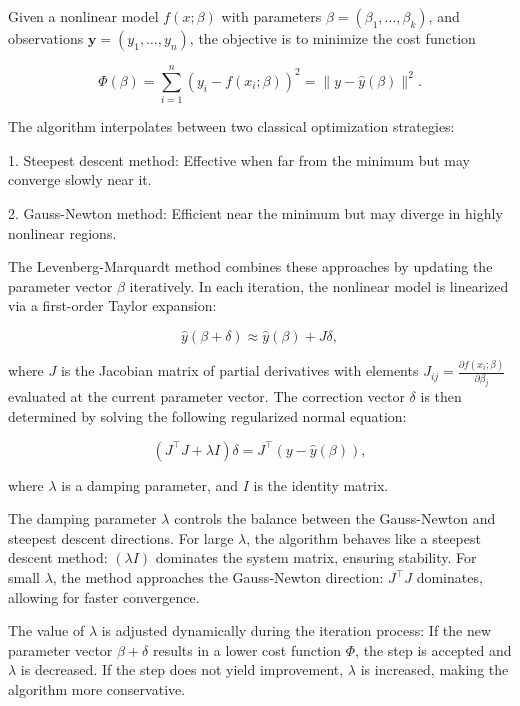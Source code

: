 Given a nonlinear model $f(x; \beta)$ with parameters $\beta = (\beta_1, \dots, \beta_k)$, and observations $\mathbf{y} = (y_1, \dots, y_n)$, the objective is to minimize the cost function

\begin{equation}
	\Phi(\beta) = \sum_{i=1}^{n} \left( y_i - f(x_i; \beta) \right)^2 = \| y - \hat{y}(\beta) \|^2.
\end{equation}

The algorithm interpolates between two classical optimization strategies:

1. Steepest descent method: Effective when far from the minimum but may converge slowly near it.

2. Gauss-Newton method: Efficient near the minimum but may diverge in highly nonlinear regions.

The Levenberg-Marquardt method combines these approaches by updating the parameter vector $\beta$ iteratively. In each iteration, the nonlinear model is linearized via a first-order Taylor expansion:

\begin{equation}
	\hat{y}(\beta + \delta) \approx \hat{y}(\beta) + J \delta,
\end{equation}

where $J$ is the Jacobian matrix of partial derivatives with elements $J_{ij} = \frac{\partial f(x_i; \beta)}{\partial \beta_j}$ evaluated at the current parameter vector. The correction vector $\delta$ is then determined by solving the following regularized normal equation:

\begin{equation}
	(J^\top J + \lambda I)\delta = J^\top (y - \hat{y}(\beta)),
\end{equation}

where $\lambda$ is a damping parameter, and $I$ is the identity matrix.

The damping parameter $\lambda$ controls the balance between the Gauss-Newton and steepest descent directions. For large $\lambda$, the algorithm behaves like a steepest descent method: $(\lambda I)$ dominates the system matrix, ensuring stability. For small $\lambda$, the method approaches the Gauss-Newton direction: $J^\top J$ dominates, allowing for faster convergence.

The value of $\lambda$ is adjusted dynamically during the iteration process:
If the new parameter vector $\beta + \delta$ results in a lower cost function $\Phi$, the step is accepted and $\lambda$ is decreased. If the step does not yield improvement, $\lambda$ is increased, making the algorithm more conservative.

